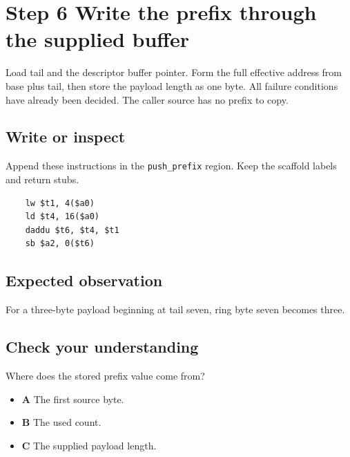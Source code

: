 \section{Step 6 Write the prefix through the supplied buffer}\label{ring-s06}

Load tail and the descriptor buffer pointer. Form the full effective address from base plus tail, then store the payload length as one byte. All failure conditions have already been decided. The caller source has no prefix to copy.

\subsection{Write or inspect}
Append these instructions in the \texttt{push\_prefix} region. Keep the scaffold labels and return stubs.

\begin{verbatim}
    lw $t1, 4($a0)
    ld $t4, 16($a0)
    daddu $t6, $t4, $t1
    sb $a2, 0($t6)
\end{verbatim}

\subsection{Expected observation}
For a three-byte payload beginning at tail seven, ring byte seven becomes three.

\subsection{Check your understanding}
Where does the stored prefix value come from?

\begin{itemize}
  \item \textbf{A} The first source byte.
  \item \textbf{B} The used count.
  \item \textbf{C} The supplied payload length.
\end{itemize}
